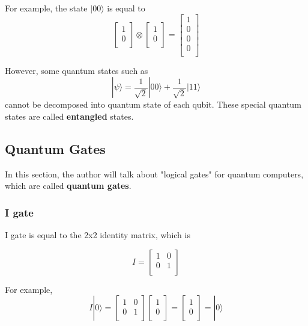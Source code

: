   For example, the state $|00\rangle$ is equal to 
  $$  \left[
\begin{array}{c}
1 \\
0 \\
\end{array}
\right]
\otimes
 \left[
\begin{array}{c}
1 \\
0 \\
\end{array}
\right]
= \left[
\begin{array}{c}
1 \\
0 \\
0 \\
0 \\
\end{array}
\right]$$

 However, some quantum states such as
 $$ |\psi\rangle = \frac{1}{\sqrt{2}}|00\rangle + \frac{1}{\sqrt{2}}|11\rangle$$ cannot be decomposed into quantum state of each qubit.  These special quantum states are called \textbf{entangled} states.
 
 

\newpage

\subsection{Quantum Gates}

 In this section, the author will talk about "logical gates" for quantum computers, which are called \textbf{quantum gates}.
 
\subsubsection{I gate}

I gate is equal to the 2x2 identity matrix, which is 

$$ I = \begin{bmatrix}
1 & 0 \\
0 & 1 \\
\end{bmatrix}
$$

For example,
$$ I|0\rangle = \begin{bmatrix}
1 & 0 \\
0 & 1 \\
\end{bmatrix} 
\left[
\begin{array}{c}
1 \\
0 \\
\end{array}
\right]
= \left[
\begin{array}{c}
1 \\
0 \\
\end{array}
\right]
= |0\rangle
$$

